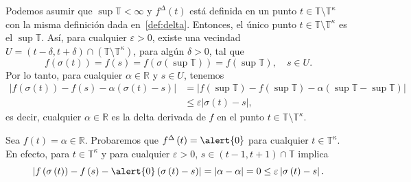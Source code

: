 \begin{frame}

\begin{remark}
Podemos asumir que $\sup\mathds{T}<\infty$ y $f^{\Delta}\left(t\right)$ está definida en un punto $t\in\mathds{T}\setminus\mathds{T}^{\kappa}$ con la misma definición dada en~\ref{def:delta}. Entonces, el único punto $t\in\mathds{T}\setminus\mathds{T}^{\kappa}$ es el $\sup\mathds{T}$. Así, para cualquier $\varepsilon>0$, existe una vecindad $U=\left(t-\delta,t+\delta\right)\cap\left(\mathds{T}\setminus\mathds{T}^{\kappa}\right)$, para algún $\delta>0$, tal que \[ f\left(\sigma\left(t\right)\right)=f\left(s\right)=f\left(\sigma\left(\sup\mathds{T}\right)\right)=f\left(\sup\mathds{T}\right),\quad s\in U. \] Por lo tanto, para cualquier $\alpha\in\mathds{R}$ y $s\in U$, tenemos
	\begin{align*}
		\left|f\left(\sigma\left(t\right)\right)-f\left(s\right)-\alpha\left(\sigma\left(t\right)-s\right)\right|
		&=\left|f\left(\sup\mathds{T}\right)-f\left(\sup\mathds{T}\right)-\alpha\left(\sup\mathds{T}-\sup\mathds{T}\right)\right|\\
		&\leq\varepsilon\left|\sigma\left(t\right)-s\right|,
	\end{align*}
es decir, cualquier $\alpha\in\mathds{R}$ es la delta derivada de $f$ en el punto $t\in\mathds{T}\setminus\mathds{T}^{\kappa}$.
\end{remark}

\begin{example}
	Sea $f\left(t\right)=\alpha\in\mathds{R}$. Probaremos que $f^{\Delta}\left(t\right)=\alert{0}$ para cualquier $t\in\mathds{T}^{\kappa}$. En efecto, para $t\in\mathds{T}^{\kappa}$ y para cualquier $\varepsilon>0$, $s\in\left(t-1,t+1\right)\cap\mathds{T}$ implica \[ \left|f\left(\sigma\left(t\right)\right)-f\left(s\right)-\alert{0}\left(\sigma\left(t\right)-s\right)\right|=\left|\alpha-\alpha\right|=0\leq\varepsilon\left|\sigma\left(t\right)-s\right|. \]
\end{example}

\end{frame}

